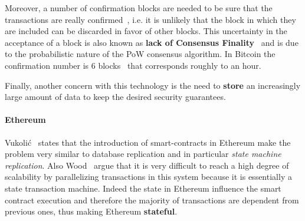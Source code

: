 Moreover, a number of confirmation blocks are
needed to be sure that the transactions are really 
confirmed~\cite{bib:taxonomy}, i.e. it is unlikely that the block in which
they are included can be discarded in favor of other blocks.
This uncertainty in the acceptance of a block is also known as
\textbf{lack of Consensus Finality}~\cite{bib:the-quest} and is due to the
probabilistic nature of the PoW consensus algorithm.
In Bitcoin the 
confirmation number is 6 blocks~\cite{bib:masteringbitcoin} that corresponds 
roughly to an hour.

Finally, another concern with this technology is the need to \textbf{store} an
increasingly large amount of data to keep the desired security guarantees.
 
\paragraph{Ethereum} Vukoli\'c~\cite{bib:the-quest} states that the introduction
of smart-contracts 
in Ethereum make the problem very similar to database replication and in 
particular \emph{state machine replication}. Also Wood~\cite{wood2018ethereum}
argue that it is very difficult to reach a high degree of scalability by
parallelizing transactions in this system because it is essentially a state
transaction machine.
Indeed the state in Ethereum influence the smart contract execution and
therefore the majority of transactions are dependent from previous ones, thus
making Ethereum \textbf{stateful}.



